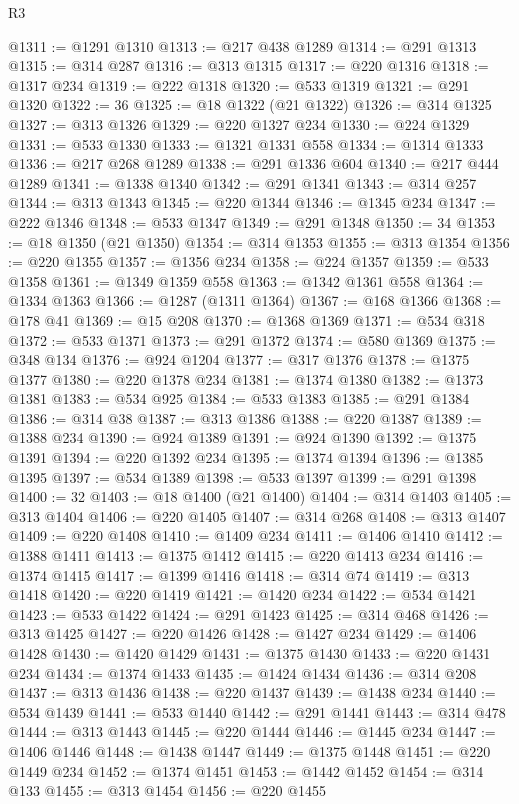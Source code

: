 \begin{lexlean}{R3}
\begin{coremodule}
@1311 := @1291 @1310
@1313 := @217 @438 @1289
@1314 := @291 @1313
@1315 := @314 @287
@1316 := @313 @1315
@1317 := @220 @1316
@1318 := @1317 @234
@1319 := @222 @1318
@1320 := @533 @1319
@1321 := @291 @1320
@1322 := 36
@1325 := @18 @1322 (@21 @1322)
@1326 := @314 @1325
@1327 := @313 @1326
@1329 := @220 @1327 @234
@1330 := @224 @1329
@1331 := @533 @1330
@1333 := @1321 @1331 @558
@1334 := @1314 @1333
@1336 := @217 @268 @1289
@1338 := @291 @1336 @604
@1340 := @217 @444 @1289
@1341 := @1338 @1340
@1342 := @291 @1341
@1343 := @314 @257
@1344 := @313 @1343
@1345 := @220 @1344
@1346 := @1345 @234
@1347 := @222 @1346
@1348 := @533 @1347
@1349 := @291 @1348
@1350 := 34
@1353 := @18 @1350 (@21 @1350)
@1354 := @314 @1353
@1355 := @313 @1354
@1356 := @220 @1355
@1357 := @1356 @234
@1358 := @224 @1357
@1359 := @533 @1358
@1361 := @1349 @1359 @558
@1363 := @1342 @1361 @558
@1364 := @1334 @1363
@1366 := @1287 (@1311 @1364)
@1367 := @168 @1366
@1368 := @178 @41
@1369 := @15 @208
@1370 := @1368 @1369
@1371 := @534 @318
@1372 := @533 @1371
@1373 := @291 @1372
@1374 := @580 @1369
@1375 := @348 @134
@1376 := @924 @1204
@1377 := @317 @1376
@1378 := @1375 @1377
@1380 := @220 @1378 @234
@1381 := @1374 @1380
@1382 := @1373 @1381
@1383 := @534 @925
@1384 := @533 @1383
@1385 := @291 @1384
@1386 := @314 @38
@1387 := @313 @1386
@1388 := @220 @1387
@1389 := @1388 @234
@1390 := @924 @1389
@1391 := @924 @1390
@1392 := @1375 @1391
@1394 := @220 @1392 @234
@1395 := @1374 @1394
@1396 := @1385 @1395
@1397 := @534 @1389
@1398 := @533 @1397
@1399 := @291 @1398
@1400 := 32
@1403 := @18 @1400 (@21 @1400)
@1404 := @314 @1403
@1405 := @313 @1404
@1406 := @220 @1405
@1407 := @314 @268
@1408 := @313 @1407
@1409 := @220 @1408
@1410 := @1409 @234
@1411 := @1406 @1410
@1412 := @1388 @1411
@1413 := @1375 @1412
@1415 := @220 @1413 @234
@1416 := @1374 @1415
@1417 := @1399 @1416
@1418 := @314 @74
@1419 := @313 @1418
@1420 := @220 @1419
@1421 := @1420 @234
@1422 := @534 @1421
@1423 := @533 @1422
@1424 := @291 @1423
@1425 := @314 @468
@1426 := @313 @1425
@1427 := @220 @1426
@1428 := @1427 @234
@1429 := @1406 @1428
@1430 := @1420 @1429
@1431 := @1375 @1430
@1433 := @220 @1431 @234
@1434 := @1374 @1433
@1435 := @1424 @1434
@1436 := @314 @208
@1437 := @313 @1436
@1438 := @220 @1437
@1439 := @1438 @234
@1440 := @534 @1439
@1441 := @533 @1440
@1442 := @291 @1441
@1443 := @314 @478
@1444 := @313 @1443
@1445 := @220 @1444
@1446 := @1445 @234
@1447 := @1406 @1446
@1448 := @1438 @1447
@1449 := @1375 @1448
@1451 := @220 @1449 @234
@1452 := @1374 @1451
@1453 := @1442 @1452
@1454 := @314 @133
@1455 := @313 @1454
@1456 := @220 @1455

\end{coremodule}
\end{lexlean}
